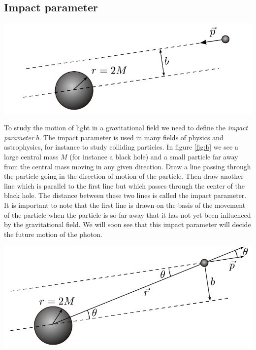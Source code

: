 {\begin{multicols}{2}
\section{Impact parameter}
\label{sect:impact}

\begin{Figure}
\centering
\includegraphics[width=\textwidth]{fig_18-1.pdf}
\end{Figure}


To study the motion of light in a gravitational field we need to define the {\it impact parameter} $b$. The impact parameter is used in many fields of physics and astrophysics, for instance to study colliding particles. In figure \ref{fig:b} we see a large central mass $M$ (for instance a black hole) and a small particle far away from the central mass moving in any given direction. Draw a line passing through the particle going in the direction of motion of the particle. Then draw another line which is parallel to the first line but which passes through the center of the black hole. The distance between these two lines is called the impact parameter. It is important to note that the first line is drawn on the basis of the movement of the particle when the particle is so far away that it has not yet been influenced by the gravitational field. We will soon see that this impact parameter will decide the future motion of the photon.


\begin{Figure}
\centering
\includegraphics[width=\textwidth]{fig_18-2.pdf}
\end{Figure}



\end{multicols}}
